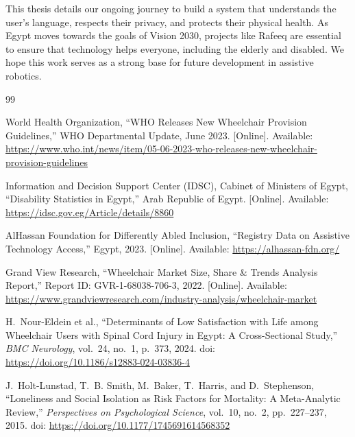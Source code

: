 \documentclass[12pt,a4paper]{report}
\begin{document}
This thesis details our ongoing journey to build a system that understands the user's language, respects their privacy, and protects their physical health. As Egypt moves towards the goals of Vision 2030, projects like Rafeeq are essential to ensure that technology helps everyone, including the elderly and disabled. We hope this work serves as a strong base for future development in assistive robotics.

\renewcommand{\bibname}{References}
\begin{singlespace}
\begin{thebibliography}{99}

World Health Organization, ``WHO Releases New Wheelchair Provision Guidelines,''
WHO Departmental Update, June 2023. [Online]. Available:
\url{https://www.who.int/news/item/05-06-2023-who-releases-new-wheelchair-provision-guidelines}

Information and Decision Support Center (IDSC), Cabinet of Ministers of Egypt,
``Disability Statistics in Egypt,'' Arab Republic of Egypt. [Online]. Available:
\url{https://idsc.gov.eg/Article/details/8860}

AlHassan Foundation for Differently Abled Inclusion, ``Registry Data on Assistive
Technology Access,'' Egypt, 2023. [Online]. Available:
\url{https://alhassan-fdn.org/}


Grand View Research, ``Wheelchair Market Size, Share \& Trends Analysis Report,''
Report ID: GVR-1-68038-706-3, 2022. [Online]. Available:
\url{https://www.grandviewresearch.com/industry-analysis/wheelchair-market}


H.~Nour-Eldein et al., ``Determinants of Low Satisfaction with Life among
Wheelchair Users with Spinal Cord Injury in Egypt: A Cross-Sectional Study,''
\textit{BMC Neurology}, vol.~24, no.~1, p.~373, 2024.
doi: \url{https://doi.org/10.1186/s12883-024-03836-4}

J.~Holt-Lunstad, T.~B. Smith, M.~Baker, T.~Harris, and D.~Stephenson,
``Loneliness and Social Isolation as Risk Factors for Mortality: A
Meta-Analytic Review,'' \textit{Perspectives on Psychological Science},
vol.~10, no.~2, pp.~227--237, 2015.
doi: \url{https://doi.org/10.1177/1745691614568352}


\end{thebibliography}
\end{singlespace}
\end{document}
